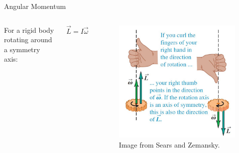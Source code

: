 \documentclass[]{beamer}
\begin{document}
\begin{frame}


Angular Momentum

\vspace{7mm}



\begin{columns}[c]
  \column{2in}  %
 

  For a rigid body rotating around a symmetry axis:

  \begin{equation}
    \vec{L}=I\vec{\omega}
   \end{equation}

  \column{2in}


 
  
  
     
   \begin{figure}[h!]  
    \includegraphics[width=1.2\textwidth]{images/12.jpg}
    \caption{Image from Sears and Zemansky.}
  \end{figure}
  


  \end{columns}




\end{frame}
\end{document}
